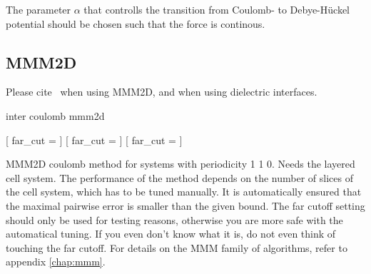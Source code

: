 The parameter $\alpha$ that controlls the transition from Coulomb- to Debye-H\"uckel potential should be chosen such that the force is continous.

\subsection{MMM2D}

\begin{citebox}
  Please cite~ when using MMM2D, and
   when using dielectric interfaces.
\end{citebox}


\begin{essyntax}
 inter coulomb  mmm2d 
  \begin{features}
  \end{features}
\end{essyntax}
\begin{pysyntax}
	[
		far_cut = 
	]
	[
		far_cut = 
	]
	[
		far_cut = 
	]
\end{pysyntax}

MMM2D coulomb method for systems with periodicity 1 1 0. Needs the
layered cell system. The performance of the method depends on the
number of slices of the cell system, which has to be tuned manually.
It is automatically ensured that the maximal pairwise error is smaller
than the given bound. The far cutoff setting should only be used for
testing reasons, otherwise you are more safe with the automatical
tuning. If you even don't know what it is, do not even think of
touching the far cutoff. For details on the MMM family of algorithms,
refer to appendix \vref{chap:mmm}.

